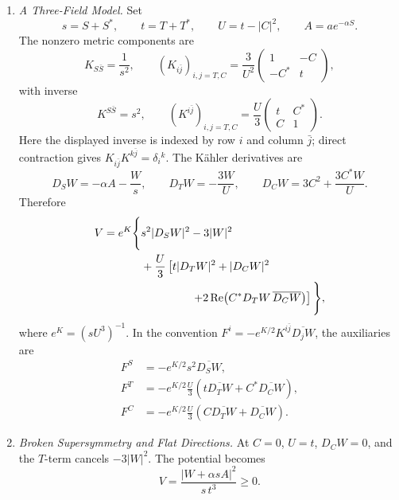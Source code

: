 \begin{enumerate}
  \begin{enumerate}
    \item \emph{A Three-Field Model.}
    Set
      \[
        s=S+S^*,\qquad
        t=T+T^*,\qquad
        U=t-|C|^2,\qquad
        A=ae^{-\alpha S}.
      \]
      The nonzero metric components are
      \[
      K_{S\bar S}=\frac1{s^2},\qquad
      (K_{i\bar j})_{i,j=T,C}
        =\frac3{U^2}
          \begin{pmatrix}1&-C\\-C^*&t\end{pmatrix},
      \]
      with inverse
      \[
      K^{S\bar S}=s^2,\qquad
      (K^{i\bar j})_{i,j=T,C}
        =\frac U3
          \begin{pmatrix}t&C^*\\C&1\end{pmatrix}.
      \]
      Here the displayed inverse is indexed by row \(i\) and column
      \(\bar j\); direct contraction gives
      \(K_{i\bar j}K^{k\bar j}=\delta_i{}^k\).
      The Kähler derivatives are
      \[
        D_SW=-\alpha A-\frac Ws,\qquad
        D_TW=-\frac{3W}{U},\qquad
        D_CW=3C^2+\frac{3C^*W}{U}.
      \]
      Therefore
      \[
      \begin{aligned}
        V=e^K\Bigg\{&
          s^2|D_SW|^2-3|W|^2\\
          &+\frac U3\left[
            t|D_TW|^2+|D_CW|^2\right.\\
          &\hspace{4.5em}\left.
            +2\operatorname{Re}\!\left(
              C^*D_TW\,\overline{D_CW}\right)\right]\Bigg\},
      \end{aligned}
      \]
      where \(e^K=(sU^3)^{-1}\).  In the convention
      \(F^i=-e^{K/2}K^{i\bar j}\overline{D_jW}\), the auxiliaries are
      \[
      \begin{aligned}
        F^S&=-e^{K/2}s^2\overline{D_SW},\\
        F^T&=-e^{K/2}\frac U3
          \left(t\overline{D_TW}+C^*\overline{D_CW}\right),\\
        F^C&=-e^{K/2}\frac U3
          \left(C\overline{D_TW}+\overline{D_CW}\right).
      \end{aligned}
      \]
    \item \emph{Broken Supersymmetry and Flat Directions.}
    At \(C=0\), \(U=t\), \(D_CW=0\), and the \(T\)-term cancels
      \(-3|W|^2\).  The potential becomes
      \[
        V=\frac{|W+\alpha sA|^2}{s\,t^3}\ge0.
      \]

\end{enumerate}
\end{enumerate}
